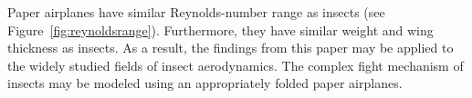 Paper airplanes have similar Reynolds-number range as insects (see Figure~\ref{fig:reynoldsrange}). Furthermore, they have similar weight and wing thickness as
insects. As a result, the findings from this paper may be applied to the widely studied fields of insect aerodynamics. The complex fight mechanism of insects may
be modeled using an appropriately folded paper airplanes.

